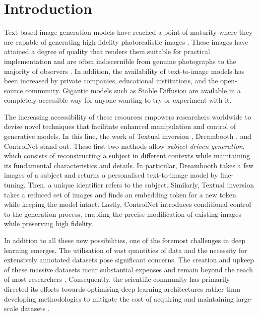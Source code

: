 \chapter{Introduction}

Text-based image generation models have reached a point of maturity where they are capable of generating high-fidelity photorealistic images \cite{ho2020denoising, dhariwal2021diffusion}. These images have attained a degree of quality that renders them suitable for practical implementation and are often indiscernible from genuine photographs to the majority of observers \cite{newyorktimesbelieve}. In addition, the availability of text-to-image models has been increased by private companies, educational institutions, and the open-source community. Gigantic models such as Stable Diffusion are available in a completely accessible way for anyone wanting to try or experiment with it. 

The increasing accessibility of these resources empowers researchers worldwide to devise novel techniques that facilitate enhanced manipulation and control of generative models. In this line, the work of Textual inversion \cite{gal2022image}, Dreambooth \cite{ruiz2023dreambooth}, and ControlNet \cite{zhang2023adding} stand out. These first two methods allow \textit{subject-driven generation}, which consists of reconstructing a subject in different contexts while maintaining its fundamental characteristics and details. In particular, Dreambooth takes a few images of a subject and returns a personalised text-to-image model by fine-tuning. Then, a unique identifier refers to the subject. Similarly, Textual inversion takes a reduced set of images and finds an embedding token for a new token while keeping the model intact. Lastly, ControlNet introduces conditional control to the generation process, enabling the precise modification of existing images while preserving high fidelity.

In addition to all these new possibilities, one of the foremost challenges in deep learning emerges. The utilisation of vast quantities of data and the necessity for extensively annotated datasets pose significant concerns. The creation and upkeep of these massive datasets incur substantial expenses and remain beyond the reach of most researchers \cite{yang2022image}. Consequently, the scientific community has primarily directed its efforts towards optimising deep learning architectures rather than developing methodologies to mitigate the cost of acquiring and maintaining large-scale datasets \cite{ghiasi2021simple}.

